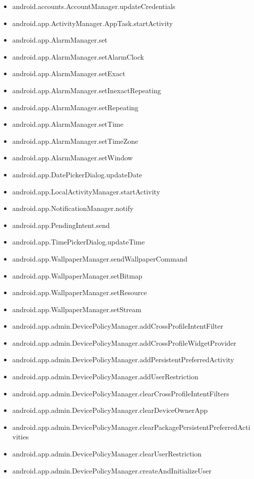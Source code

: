 \documentclass{sig-alternate}
\begin{document}
\begin{itemize}
\item android.accounts.AccountManager.updateCredentials
\item android.app.ActivityManager.AppTask.startActivity
\item android.app.AlarmManager.set
\item android.app.AlarmManager.setAlarmClock
\item android.app.AlarmManager.setExact
\item android.app.AlarmManager.setInexactRepeating
\item android.app.AlarmManager.setRepeating
\item android.app.AlarmManager.setTime
\item android.app.AlarmManager.setTimeZone
\item android.app.AlarmManager.setWindow
\item android.app.DatePickerDialog.updateDate
\item android.app.LocalActivityManager.startActivity
\item android.app.NotificationManager.notify
\item android.app.PendingIntent.send
\item android.app.TimePickerDialog.updateTime
\item android.app.WallpaperManager.sendWallpaperCommand
\item android.app.WallpaperManager.setBitmap
\item android.app.WallpaperManager.setResource
\item android.app.WallpaperManager.setStream
\item android.app.admin.DevicePolicyManager.addCrossProfileIntentFilter
\item android.app.admin.DevicePolicyManager.addCrossProfileWidgetProvider
\item android.app.admin.DevicePolicyManager.addPersistentPreferredActivity
\item android.app.admin.DevicePolicyManager.addUserRestriction
\item android.app.admin.DevicePolicyManager.clearCrossProfileIntentFilters
\item android.app.admin.DevicePolicyManager.clearDeviceOwnerApp
\item android.app.admin.DevicePolicyManager.clearPackagePersistentPreferredActivities
\item android.app.admin.DevicePolicyManager.clearUserRestriction
\item android.app.admin.DevicePolicyManager.createAndInitializeUser

\end{itemize}
\end{document}
